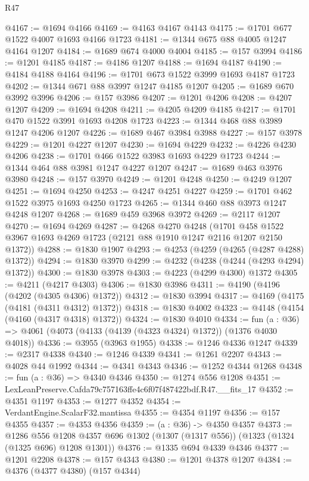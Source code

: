 \begin{lexlean}{R47}
\begin{coremodule}
@4167 := @1694 @4166
@4169 := @4163 @4167 @4143
@4175 := @1701 @677 @1522 @4007 @1693 @4166 @1723
@4181 := @1344 @675 @88 @4005 @1247 @4164 @1207
@4184 := @1689 @674 @4000 @4004
@4185 := @157 @3994
@4186 := @1201 @4185
@4187 := @4186 @1207
@4188 := @1694 @4187
@4190 := @4184 @4188 @4164
@4196 := @1701 @673 @1522 @3999 @1693 @4187 @1723
@4202 := @1344 @671 @88 @3997 @1247 @4185 @1207
@4205 := @1689 @670 @3992 @3996
@4206 := @157 @3986
@4207 := @1201 @4206
@4208 := @4207 @1207
@4209 := @1694 @4208
@4211 := @4205 @4209 @4185
@4217 := @1701 @470 @1522 @3991 @1693 @4208 @1723
@4223 := @1344 @468 @88 @3989 @1247 @4206 @1207
@4226 := @1689 @467 @3984 @3988
@4227 := @157 @3978
@4229 := @1201 @4227 @1207
@4230 := @1694 @4229
@4232 := @4226 @4230 @4206
@4238 := @1701 @466 @1522 @3983 @1693 @4229 @1723
@4244 := @1344 @464 @88 @3981 @1247 @4227 @1207
@4247 := @1689 @463 @3976 @3980
@4248 := @157 @3970
@4249 := @1201 @4248
@4250 := @4249 @1207
@4251 := @1694 @4250
@4253 := @4247 @4251 @4227
@4259 := @1701 @462 @1522 @3975 @1693 @4250 @1723
@4265 := @1344 @460 @88 @3973 @1247 @4248 @1207
@4268 := @1689 @459 @3968 @3972
@4269 := @2117 @1207
@4270 := @1694 @4269
@4287 := @4268
    @4270
    @4248
    (@1701 @458 @1522 @3967 @1693 @4269 @1723 (@2121 @88 @1910 @1247 @2116 @1207 @2150 @1372))
@4288 := @1830 @1907
@4293 := @4253 (@4259 (@4265 (@4287 @4288) @1372))
@4294 := @1830 @3970
@4299 := @4232 (@4238 (@4244 (@4293 @4294) @1372))
@4300 := @1830 @3978
@4303 := @4223 (@4299 @4300) @1372
@4305 := @4211 (@4217 @4303)
@4306 := @1830 @3986
@4311 := @4190 (@4196 (@4202 (@4305 @4306) @1372))
@4312 := @1830 @3994
@4317 := @4169 (@4175 (@4181 (@4311 @4312) @1372))
@4318 := @1830 @4002
@4323 := @4148 (@4154 (@4160 (@4317 @4318) @1372))
@4324 := @1830 @4010
@4334 := fun (a : @36) => @4061 (@4073 (@4133 (@4139 (@4323 @4324) @1372)) (@1376 @4030 @4018))
@4336 := @3955 (@3963 @1955)
@4338 := @1246 @4336 @1247
@4339 := @2317 @4338
@4340 := @1246 @4339
@4341 := @1261 @2207
@4343 := @4028 @44 @1992
@4344 := @4341 @4343
@4346 := @1252 @4344 @1268
@4348 := fun (a : @36) => @4340 @4346
@4350 := @1274 @556 @1208
@4351 := LexLeanPreserve.Cafda79c757163ffe4c6f07f487422bdf.R47.__fits_17
@4352 := @4351 @1197
@4353 := @1277 @4352
@4354 := VerdantEngine.ScalarF32.mantissa
@4355 := @4354 @1197
@4356 := @157 @4355
@4357 := @4353 @4356
@4359 := (a : @36) -> @4350 @4357
@4373 := @1286
    @556
    @1208
    @4357
    @696
    @1302
    (@1307 (@1317 @556))
    (@1323 (@1324 (@1325 @696) @1208 @1301))
@4376 := @1335 @694 @4339 @4346
@4377 := @1201 @2208
@4378 := @157 @4343
@4380 := @1201 @4378 @1207
@4384 := @4376 (@4377 @4380) (@157 @4344)

\end{coremodule}
\end{lexlean}
